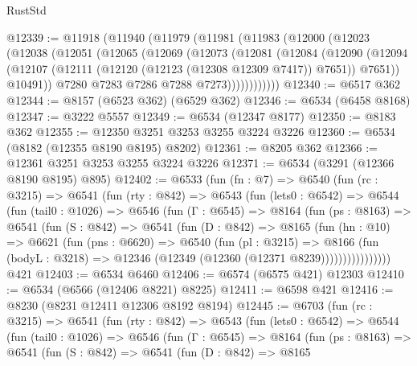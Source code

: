 \begin{lexlean}{RustStd}
\begin{coremodule}
@12339 := @11918
    (@11940
      (@11979
        (@11981
          (@11983
            (@12000
              (@12023
                (@12038
                  (@12051
                    (@12065
                      (@12069
                        (@12073
                          (@12081
                            (@12084
                              (@12090
                                (@12094
                                  (@12107
                                    (@12111 (@12120 (@12123 (@12308 @12309 @7417)) @7651))
                                    @7651))
                                @10491))
                            @7280
                            @7283
                            @7286
                            @7288
                            @7273))))))))))))
@12340 := @6517 @362
@12344 := @8157 (@6523 @362) (@6529 @362)
@12346 := @6534 (@6458 @8168)
@12347 := @3222 @5557
@12349 := @6534 (@12347 @8177)
@12350 := @8183 @362
@12355 := @12350 @3251 @3253 @3255 @3224 @3226
@12360 := @6534 (@8182 (@12355 @8190 @8195) @8202)
@12361 := @8205 @362
@12366 := @12361 @3251 @3253 @3255 @3224 @3226
@12371 := @6534 (@3291 (@12366 @8190 @8195) @895)
@12402 := @6533
    (fun (fn : @7) =>
    @6540
      (fun (rc : @3215) =>
      @6541
        (fun (rty : @842) =>
        @6543
          (fun (lets0 : @6542) =>
          @6544
            (fun (tail0 : @1026) =>
            @6546
              (fun (Γ : @6545) =>
              @8164
                (fun (ps : @8163) =>
                @6541
                  (fun (S : @842) =>
                  @6541
                    (fun (D : @842) =>
                    @8165
                      (fun (hn : @10) =>
                      @6621
                        (fun (pns : @6620) =>
                        @6540
                          (fun (pl : @3215) =>
                          @8166
                            (fun (bodyL : @3218) =>
                            @12346 (@12349 (@12360 (@12371 @8239))))))))))))))))
    @421
@12403 := @6534 @6460
@12406 := @6574 (@6575 @421) @12303
@12410 := @6534 (@6566 (@12406 @8221) @8225)
@12411 := @6598 @421
@12416 := @8230 (@8231 @12411 @12306 @8192 @8194)
@12445 := @6703
    (fun (rc : @3215) =>
    @6541
      (fun (rty : @842) =>
      @6543
        (fun (lets0 : @6542) =>
        @6544
          (fun (tail0 : @1026) =>
          @6546
            (fun (Γ : @6545) =>
            @8164
              (fun (ps : @8163) =>
              @6541
                (fun (S : @842) =>
                @6541
                  (fun (D : @842) =>
                  @8165

\end{coremodule}
\end{lexlean}
